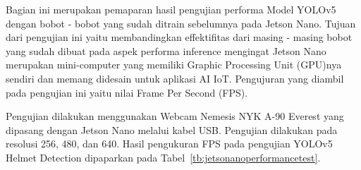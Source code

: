 \par Bagian ini merupakan pemaparan hasil pengujian performa Model YOLOv5 dengan bobot - bobot yang sudah ditrain sebelumnya pada Jetson Nano. Tujuan dari pengujian ini yaitu membandingkan effektifitas dari masing - masing bobot yang sudah dibuat pada aspek performa inference mengingat Jetson Nano merupakan mini-computer yang memiliki Graphic Processing Unit (GPU)nya sendiri dan memang didesain untuk aplikasi AI IoT. Pengujuran yang diambil pada pengujian ini yaitu nilai Frame Per Second (FPS).

 
\par Pengujian dilakukan menggunakan Webcam Nemesis NYK A-90 Everest yang dipasang dengan Jetson Nano melalui kabel USB. Pengujian dilakukan pada resolusi 256, 480, dan 640. Hasil pengukuran FPS pada pengujian YOLOv5 Helmet Detection dipaparkan pada Tabel~\ref{tb:jetsonanoperformancetest}.
